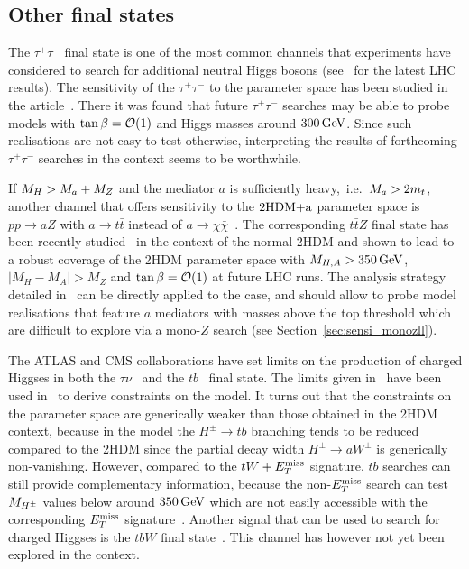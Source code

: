 \subsection{Other final states}
\label{sec:others}

The $\tau^+ \tau^-$ final state is one of the most common channels that experiments have considered to search for additional neutral Higgs bosons (see~\cite{Aaboud:2017sjh,Sirunyan:2018zut} for the latest LHC results). The sensitivity of the $\tau^+ \tau^-$ to the \hdma parameter space has been studied in the article~\cite{Bauer:2017ota}. There it was found that future $\tau^+ \tau^-$ searches may be able to probe models with $\tan \beta  = {\cal O} (1)$ and Higgs masses around $300 \, {\rm GeV}$. Since such realisations are not easy to test otherwise, interpreting the results of forthcoming  $\tau^+ \tau^-$ searches in the \hdma context seems to be worthwhile.  

If $M_{H} > M_{a} + M_Z$ and the mediator $a$ is sufficiently heavy,~i.e.~$M_{a} > 2 m_t$, another channel that offers sensitivity to the  $\textrm{2HDM+a}$ parameter space is $pp \to aZ$ with $a \to t \bar t$ instead of $a \to \chi \bar \chi$~\cite{GPHeidelberg}. The corresponding $t \bar t Z$ final state has been recently studied~\cite{Haisch:2018djm} in the context of the normal 2HDM and shown to lead to a robust coverage of the 2HDM parameter space with $M_{H,A} > 350 \, {\rm GeV}$, $|M_H - M_A| > M_Z$ and $\tan \beta = {\cal O} (1)$ at future LHC runs. The analysis strategy detailed in~\cite{Haisch:2018djm} can be directly applied to the \hdma case, and should allow to probe model realisations that feature $a$ mediators with masses above the top threshold which are difficult to explore via a mono-$Z$ search (see Section~\ref{sec:sensi_monozll}).

The ATLAS and CMS collaborations have set limits on the production of charged Higgses in both the $\tau \nu$~\cite{Aaboud:2016dig,CMS-PAS-HIG-16-031} and the $tb$~\cite{Aad:2015typ,Khachatryan:2015qxa,ATLAS:2016qiq} final state. The limits given in~\cite{ATLAS:2016qiq} have been used in~\cite{Pani:2017qyd} to derive constraints on the \hdma model. It turns out that  the constraints on the \hdma parameter space are generically weaker than those obtained in the 2HDM context, because in the \hdma model  the $H^\pm \to tb$ branching tends to be reduced compared to the 2HDM since the partial decay width $H^\pm \to aW^\pm$ is generically non-vanishing.  However, compared to the $tW+E_T^\mathrm{miss}$ signature, $tb$ searches can still provide complementary information, because the non-$E_T^\mathrm{miss}$  search can test $M_{H^{\pm}}$ values below around $350 \, {\rm GeV}$ which are not easily accessible with the corresponding $E_T^\mathrm{miss}$ signature~\cite{Pani:2017qyd}. Another signal that can be used to search for charged Higgses is the $tbW$ final state~\cite{Haisch:2018djm}. This channel has however not yet been explored in the \hdma context. 


